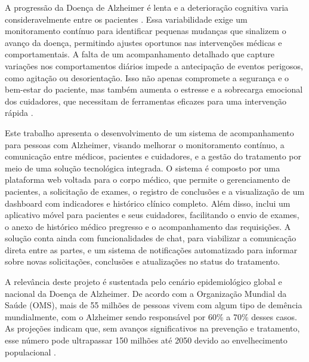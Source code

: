 \documentclass[conference,a4paper,10pt]{IEEETran}
\begin{document}
A progressão da Doença de Alzheimer é lenta e a deterioração cognitiva varia
consideravelmente entre os pacientes \cite{Scheltens2021Alzheimer}. Essa variabilidade exige um monitoramento
contínuo para identificar pequenas mudanças que sinalizem o avanço da doença,
permitindo ajustes oportunos nas intervenções médicas e comportamentais. A falta de
um acompanhamento detalhado que capture variações nos comportamentos diários
impede a antecipação de eventos perigosos, como agitação ou desorientação. Isso
não apenas compromete a segurança e o bem-estar do paciente, mas também
aumenta o estresse e a sobrecarga emocional dos cuidadores, que necessitam de
ferramentas eficazes para uma intervenção rápida \cite{carvalho_Clinical, lv_iCare}.

Este trabalho apresenta o desenvolvimento de um sistema de acompanhamento para pessoas com Alzheimer, visando melhorar o monitoramento contínuo, a comunicação entre médicos, pacientes e cuidadores, e a gestão do tratamento por meio de uma solução tecnológica integrada. O sistema é composto por uma plataforma web voltada para o corpo médico, que permite o gerenciamento de pacientes, a solicitação de exames, o registro de conclusões e a visualização de um dashboard com indicadores e histórico clínico completo. Além disso, inclui um aplicativo móvel para pacientes e seus cuidadores, facilitando o envio de exames, o anexo de histórico médico pregresso e o acompanhamento das requisições. A solução conta ainda com funcionalidades de chat, para viabilizar a comunicação direta entre as partes, e um sistema de notificações automatizado para informar sobre novas solicitações, conclusões e atualizações no status do tratamento.

A relevância deste projeto é sustentada pelo cenário epidemiológico global e nacional da Doença de Alzheimer. De acordo com a Organização Mundial da Saúde (OMS), mais de 55 milhões de pessoas vivem com algum tipo de demência mundialmente, com o Alzheimer sendo responsável por 60\% a 70\% desses casos. As projeções indicam que, sem avanços significativos na prevenção e tratamento, esse número pode ultrapassar 150 milhões até 2050 devido ao envelhecimento populacional \cite{Scheltens2021Alzheimer}.
\end{document}
